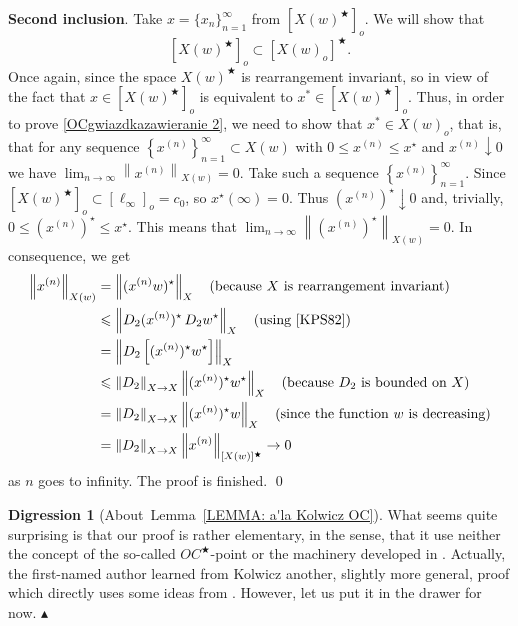 \documentclass[11pt]{amsart}
\theoremstyle{definition}
\theoremstyle{definition}
\theoremstyle{definition}
\theoremstyle{definition}
\theoremstyle{definition}
\theoremstyle{definition}
\theoremstyle{definition}
\theoremstyle{definition}
\numberwithin{equation}{section}
\numberwithin{equation}{section}
\numberwithin{equation}{section}
\theoremstyle{definition}
\theoremstyle{definition}
\theoremstyle{definition}
\theoremstyle{definition}
\newtheorem{scholium}[theorem]{Digression}
\theoremstyle{definition}
\theoremstyle{definition}
\newcommand{\norm}[1]{\left\lVert#1\right\rVert}
\renewenvironment{proof}{\noindent {\bf Proof.}}{\qed}
\newcommand\xqed[1]{%
	\leavevmode\unskip\penalty9999 \hbox{}\nobreak\hfill
	\quad\hbox{#1}}
\newcommand\demo{\xqed{{\Large $\blacktriangle$}}}
\begin{document}
\begin{proof}
			{\bf Second inclusion}. Take $x = \{x_n\}_{n=1}^{\infty}$ from $[ X(w)^{\bigstar} ]_o$. We will show that
			\begin{equation} \label{OCgwiazdkazawieranie 2}
				[ X(w)^{\bigstar} ]_o \subset [ X(w)_o ]^{\bigstar}.
			\end{equation}
			Once again, since the space $X(w)^{\bigstar}$ is rearrangement invariant, so in view of \cite[Theorem~3.6]{KKT22}
			the fact that $x \in [ X(w)^{\bigstar} ]_o$ is equivalent to $x^* \in [ X(w)^{\bigstar} ]_o$.
			Thus, in order to prove \eqref{OCgwiazdkazawieranie 2}, we need to show that $x^*\in X(w)_o$, that is,
			that for any sequence $\left\{ x^{(n)} \right\}_{n=1}^{\infty} \subset X(w)$ with $0 \leqslant x^{(n)} \leqslant x^{\star}$
			and $x^{(n)} \downarrow 0$ we have $\lim_{n \rightarrow \infty} \norm{x^{(n)}}_{X(w)} = 0$. Take such a sequence $\left\{ x^{(n)} \right\}_{n=1}^{\infty}$.
			Since $[X(w)^{\bigstar}]_o \subset [\ell_{\infty}]_o = c_0$, so $x^{\star}(\infty) = 0$.
			Thus $\left( x^{(n)} \right)^{\star} \downarrow 0$ and, trivially, $0 \leqslant \left( x^{(n)} \right)^{\star} \leqslant x^{\star}$.
			This means that $\lim_{n \rightarrow \infty} \norm{\left( x^{(n)} \right)^{\star}}_{X(w)} = 0$.
			In consequence, we get
			\begin{align*}
				\norm{x^{(n)}}_{X(w)} & = \norm{ ( x^{(n)} w )^{\star}}_{X} \quad \text{(because $X$ is rearrangement invariant)} \\
					& \leqslant \norm{D_2 ( x^{(n)} )^{\star} \, D_2 w^{\star} }_{X} \quad \text{(using \cite[Property~$10^{\circ}$, p.~67]{KPS82})} \\
					& = \norm{D_2 \left[ ( x^{(n)} )^{\star} w^{\star} \right]}_{X} \\
					& \leqslant \norm{D_2}_{X \rightarrow X} \norm{( x^{(n)} )^{\star} w^{\star}}_{X} \quad \text{(because $D_2$ is bounded on $X$)} \\
					& = \norm{D_2}_{X \rightarrow X} \norm{( x^{(n)} )^{\star} w}_{X} \quad \text{(since the function $w$ is decreasing)} \\
					& = \norm{D_2}_{X \rightarrow X} \norm{x^{(n)}}_{[X(w)]^{\bigstar}} \to 0
			\end{align*}
			as $n$ goes to infinity. The proof is finished.
		\end{proof}
	
		\begin{scholium}[About~Lemma~\ref{LEMMA: a'la Kolwicz OC}]
			What seems quite surprising is that our proof is rather elementary, in the sense, that it use neither the concept of the so-called $OC^{\bigstar}$-point
			or the machinery developed in \cite{Kol16}. Actually, the first-named author learned from Kolwicz another, slightly more general,
			proof which directly uses some ideas from \cite{Kol16}. However, let us put it in the drawer for now.
			\demo
		\end{scholium}
		
\end{document}
